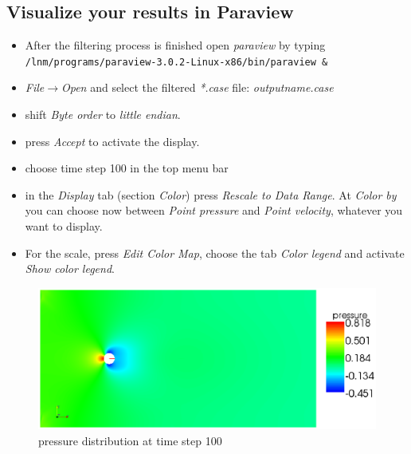 \subsection{Visualize your results in Paraview}
\begin{itemize}
\item After the filtering process is finished open \emph{paraview} by typing \newline
\texttt{/lnm/programs/paraview-3.0.2-Linux-x86/bin/paraview \&}
\item \emph{File$\to$Open} and select the filtered \emph{*.case}
file: \emph{outputname.case}
\item shift \emph{Byte order} to \emph{little endian}. 
\item press \emph{Accept} to activate the display.
\item choose time step 100 in the top menu bar 
\item in the \emph{Display} tab (section \emph{Color}) press \emph{Rescale to Data Range}. At \emph{Color by} you can choose now
between \emph{Point pressure} and \emph{Point velocity}, whatever
you want to display.
\item For the scale, press \emph{Edit Color Map}, choose the tab \emph{Color legend} and activate \emph{Show color legend}.
\end{itemize}
\begin{figure}[h]
\begin{center}
 \includegraphics[scale=0.7]{pics/tut_fluid_pres}
 \caption{pressure distribution at time step 100}
\label{fig:tut_fluid_mesh}
\end{center}
\end{figure}
